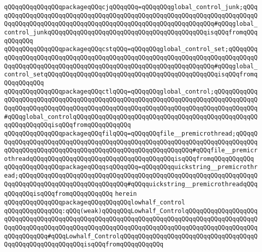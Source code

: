 \verb|qQQqqQQqqQQqqQQqpackageqQQqcjqQQqqQQq=qQQqqQQqglobal_control_junk;qQQqqQQqqQQqqQQqqQQqqQQqqQQqqQQqqQQqqQQqqQQqqQQqqQQqqQQqqQQqqQQqqQQqqQQqqQQqqQQqqQQqqQQqqQQqqQQqqQQqqQQqqQQqqQQqqQQqqQQqqQQqqQQqqQQq#qQQqglobal_control_junkqQQqqQQqqQQqqQQqqQQqqQQqqQQqqQQqqQQqqQQqqQQqisqQQqfromqQQqqQQqqQQq|\newline
\verb|qQQqqQQqqQQqqQQqpackageqQQqcstqQQq=qQQqqQQqglobal_control_set;qQQqqQQqqQQqqQQqqQQqqQQqqQQqqQQqqQQqqQQqqQQqqQQqqQQqqQQqqQQqqQQqqQQqqQQqqQQqqQQqqQQqqQQqqQQqqQQqqQQqqQQqqQQqqQQqqQQqqQQqqQQqqQQqqQQqqQQq#qQQqglobal_control_setqQQqqQQqqQQqqQQqqQQqqQQqqQQqqQQqqQQqqQQqqQQqqQQqisqQQqfromqQQqqQQqqQQq|\newline
\verb|qQQqqQQqqQQqqQQqpackageqQQqctlqQQq=qQQqqQQqglobal_control;qQQqqQQqqQQqqQQqqQQqqQQqqQQqqQQqqQQqqQQqqQQqqQQqqQQqqQQqqQQqqQQqqQQqqQQqqQQqqQQqqQQqqQQqqQQqqQQqqQQqqQQqqQQqqQQqqQQqqQQqqQQqqQQqqQQqqQQqqQQqqQQqqQQqqQQq#qQQqglobal_controlqQQqqQQqqQQqqQQqqQQqqQQqqQQqqQQqqQQqqQQqqQQqqQQqqQQqqQQqqQQqqQQqisqQQqfromqQQqqQQqqQQq|\newline
\verb|qQQqqQQqqQQqqQQqpackageqQQqfilqQQq=qQQqqQQqfile__premicrothread;qQQqqQQqqQQqqQQqqQQqqQQqqQQqqQQqqQQqqQQqqQQqqQQqqQQqqQQqqQQqqQQqqQQqqQQqqQQqqQQqqQQqqQQqqQQqqQQqqQQqqQQqqQQqqQQqqQQqqQQqqQQqqQQq#qQQqfile__premicrothreadqQQqqQQqqQQqqQQqqQQqqQQqqQQqqQQqqQQqqQQqisqQQqfromqQQqqQQqqQQq|\newline
\verb|qQQqqQQqqQQqqQQqpackageqQQqqsqQQqqQQq=qQQqqQQqquickstring__premicrothread;qQQqqQQqqQQqqQQqqQQqqQQqqQQqqQQqqQQqqQQqqQQqqQQqqQQqqQQqqQQqqQQqqQQqqQQqqQQqqQQqqQQqqQQqqQQqqQQqqQQq#qQQqquickstring__premicrothreadqQQqqQQqqQQqisqQQqfromqQQqqQQqqQQq|\newline
\verb|herein|\newline
\newline
\verb|qQQqqQQqqQQqqQQqpackageqQQqqQQqqQQqlowhalf_control|\newline
\verb|qQQqqQQqqQQqqQQq:qQQq(weak)qQQqqQQqLowhalf_ControlqQQqqQQqqQQqqQQqqQQqqQQqqQQqqQQqqQQqqQQqqQQqqQQqqQQqqQQqqQQqqQQqqQQqqQQqqQQqqQQqqQQqqQQqqQQqqQQqqQQqqQQqqQQqqQQqqQQqqQQqqQQqqQQqqQQqqQQqqQQqqQQqqQQqqQQqqQQqqQQqqQQqqQQqqQQq#qQQqLowhalf_ControlqQQqqQQqqQQqqQQqqQQqqQQqqQQqqQQqqQQqqQQqqQQqqQQqqQQqqQQqqQQqisqQQqfromqQQqqQQqqQQq|\newline
